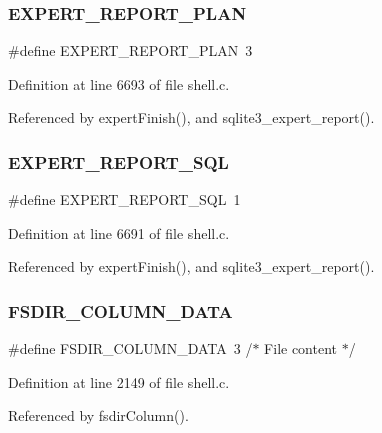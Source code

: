 \subsubsection{E\+X\+P\+E\+R\+T\+\_\+\+R\+E\+P\+O\+R\+T\+\_\+\+P\+L\+AN}
{\footnotesize\ttfamily \#define E\+X\+P\+E\+R\+T\+\_\+\+R\+E\+P\+O\+R\+T\+\_\+\+P\+L\+AN~3}



Definition at line 6693 of file shell.\+c.



Referenced by expert\+Finish(), and sqlite3\+\_\+expert\+\_\+report().

\mbox{\label{shell_8c_a64236e5e66e16526a86643a023c5d3df}} 
\subsubsection{E\+X\+P\+E\+R\+T\+\_\+\+R\+E\+P\+O\+R\+T\+\_\+\+S\+QL}
{\footnotesize\ttfamily \#define E\+X\+P\+E\+R\+T\+\_\+\+R\+E\+P\+O\+R\+T\+\_\+\+S\+QL~1}



Definition at line 6691 of file shell.\+c.



Referenced by expert\+Finish(), and sqlite3\+\_\+expert\+\_\+report().

\mbox{\label{shell_8c_a9dab4a62bde89ecd56237bc06ac6a62c}} 
\subsubsection{F\+S\+D\+I\+R\+\_\+\+C\+O\+L\+U\+M\+N\+\_\+\+D\+A\+TA}
{\footnotesize\ttfamily \#define F\+S\+D\+I\+R\+\_\+\+C\+O\+L\+U\+M\+N\+\_\+\+D\+A\+TA~3     /$\ast$ File content $\ast$/}



Definition at line 2149 of file shell.\+c.



Referenced by fsdir\+Column().

